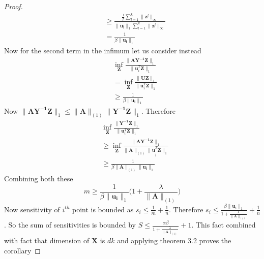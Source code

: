 \documentclass{article}
\newcommand{\M}{\mathbf}
\begin{document}
\begin{proof}
\begin{align*}
    &\geq \frac{\frac{1}{\beta}\sum_{l=1}^{k}\|\M{z}^l\|_\infty}{\|\M{u_i}\|_1\sum_{l=1}^{k}\|\M{z}^l\|_\infty}\\
    &=\frac{1}{\beta\|\M{u_i}\|_1}
\end{align*}
Now for the second term in the infimum let us consider instead
\begin{align*}
    &\inf_{\M{Z}}\frac{\|\M{AY^{-1}Z}\|_1}{\|{\M{u}}_i^T{\M{Z}}\|_1}\\
    &=\inf_{\M{Z}}\frac{\|\M{UZ}\|_1}{\|{\M{u}}_i^T{\M{Z}}\|_1}\\
    &\geq\frac{1}{\beta\|\M{u_i}\|_1}
\end{align*}
Now $\|\M{AY^{-1}Z}\|_1 \leq \|\M{A}\|_{(1)}\|\M{Y^{-1}Z}\|_1$. Therefore
\begin{align*}
    &\inf_{\M{Z}}\frac{\|\M{Y^{-1}Z}\|_1}{\|{\M{u}}_i^T{\M{Z}}\|_1}\\
    &\geq \inf_{\M{Z}}\frac{\|\M{AY^{-1}Z}\|_1}{{\|\M{A}\|_{(1)}\|\M{u}}_i^T{\M{Z}}\|_1}\\
    &\geq\frac{1}{\beta\|\M{A}\|_{(1)}\|\M{u_i}\|_1}
\end{align*}
Combining both these 
\begin{equation*}
    m \geq \frac{1}{\beta\|\M{u_i}\|_1}\bigg(1+\frac{\lambda}{\|\M{A}\|_{(1)}}\bigg)
\end{equation*}
Now sensitivity of $i^{th}$ point is bounded as $s_i \leq \frac{1}{m} +\frac{1}{n}$. Therefore $s_i \leq \frac{\beta\|\M{u}_i\|_1}{1+ \frac{\lambda}{\|\M{A}\|_{(1)}}}+\frac{1}{n}$. So the sum of sensitivities is bounded by $S \leq \frac{\alpha\beta}{1+ \frac{\lambda}{\|\M{A}\|_{(1)}}} +1 $. This fact combined with fact that dimension of $\M{X}$ is $dk$ and applying theorem 3.2 proves the corollary
\end{proof}


\end{document}
